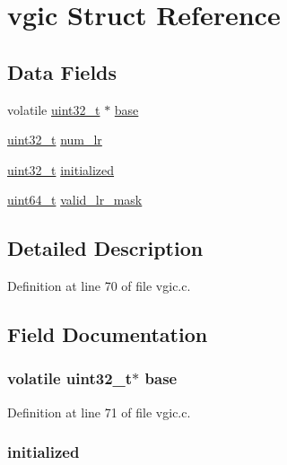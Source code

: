 \hypertarget{structvgic}{\section{vgic \-Struct \-Reference}
\label{structvgic}
}
\subsection*{\-Data \-Fields}
\begin{DoxyCompactItemize}
\item 
volatile \hyperlink{arch__types_8h_a435d1572bf3f880d55459d9805097f62}{uint32\-\_\-t} $\ast$ \hyperlink{structvgic_a40065a39150026f5f4fad044100f633d}{base}
\item 
\hyperlink{arch__types_8h_a435d1572bf3f880d55459d9805097f62}{uint32\-\_\-t} \hyperlink{structvgic_a3f8cdfb8059b41928a4b6f2b0ec89b3c}{num\-\_\-lr}
\item 
\hyperlink{arch__types_8h_a435d1572bf3f880d55459d9805097f62}{uint32\-\_\-t} \hyperlink{structvgic_a874884c7efa14474f67d1a82b795ce3c}{initialized}
\item 
\hyperlink{arch__types_8h_aaa5d1cd013383c889537491c3cfd9aad}{uint64\-\_\-t} \hyperlink{structvgic_a4d94225ddadd984b2a9c8184c960902c}{valid\-\_\-lr\-\_\-mask}
\end{DoxyCompactItemize}


\subsection{\-Detailed \-Description}


\-Definition at line 70 of file vgic.\-c.



\subsection{\-Field \-Documentation}
\hypertarget{structvgic_a40065a39150026f5f4fad044100f633d}{
\subsubsection[{base}]{\setlength{\rightskip}{0pt plus 5cm}volatile {\bf uint32\-\_\-t}$\ast$ {\bf base}}}\label{structvgic_a40065a39150026f5f4fad044100f633d}


\-Definition at line 71 of file vgic.\-c.

\hypertarget{structvgic_a874884c7efa14474f67d1a82b795ce3c}{
\subsubsection[{initialized}]{ {\bf initialized}}}\label{structvgic_a874884c7efa14474f67d1a82b795ce3c}


